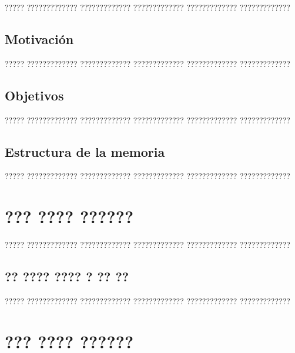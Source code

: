 \documentclass[11pt,spanish,listoffigures,listoftables]{tfgetsinf}
\begin{document}
????? ????????????? ????????????? ????????????? ????????????? ?????????????

\section{Motivación}

????? ????????????? ????????????? ????????????? ????????????? ????????????? 

\section{Objetivos}

????? ????????????? ????????????? ????????????? ????????????? ?????????????

\section{Estructura de la memoria}

????? ????????????? ????????????? ????????????? ????????????? ????????????? 




\chapter{??? ???? ??????}

????? ????????????? ????????????? ????????????? ????????????? ?????????????

\section{?? ???? ???? ? ?? ??}

????? ????????????? ????????????? ????????????? ????????????? ?????????????

\chapter{??? ???? ??????}
\end{document}
